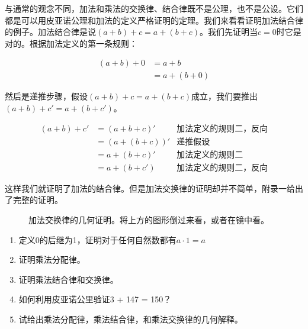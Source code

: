 \documentclass[UTF8]{article}
\begin{document}
与通常的观念不同，加法和乘法的交换律、结合律既不是公理，也不是公设。它们都是可以用皮亚诺公理和加法的定义严格证明的定理。我们来看看证明加法结合律的例子。加法结合律是说$(a + b) + c= a + (b + c)$。我们先证明当$c=0$时它是对的。根据加法定义的第一条规则：

\[
\begin{array}{rl}
(a + b) + 0 & = a + b \\
            & = a + (b + 0)
\end{array}
\]

然后是递推步骤，假设$(a + b) + c = a + (b + c)$成立，我们要推出$(a + b) + c' = a + (b + c')$。

\[
\begin{array}{rlr}
(a + b) + c' & = (a + b + c)' & \text{加法定义的规则二，反向} \\
             & = (a + (b + c))' & \text{递推假设} \\
             & = a + (b + c)' & \text{加法定义的规则二} \\
             & = a + (b + c') & \text{加法定义的规则二，反向}
\end{array}
\]

这样我们就证明了加法的结合律。但是加法交换律的证明却并不简单，附录一给出了完整的证明。

\begin{figure}[htbp]
\centering
{}
\caption{加法交换律的几何证明。将上方的图形倒过来看，或者在镜中看。}
\end{figure}

\begin{Exercise}
\begin{enumerate}
\item 定义0的后继为1，证明对于任何自然数都有$a \cdot 1 = a$
\item 证明乘法分配律。
\item 证明乘法结合律和交换律。
\item 如何利用皮亚诺公里验证3 + 147 = 150？
\item 试给出乘法分配律，乘法结合律，和乘法交换律的几何解释。
\end{enumerate}
\end{Exercise}
\end{document}
